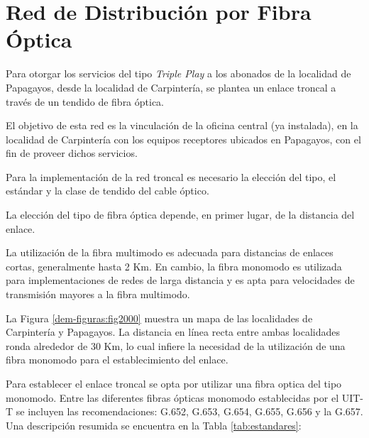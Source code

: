 \section{Red de Distribución por Fibra Óptica}


Para otorgar los servicios del tipo \textit{Triple Play} a los abonados de la localidad de Papagayos, desde la localidad de Carpintería, se plantea un enlace troncal a través de un tendido de fibra óptica.

El objetivo de esta red es la vinculación de la oficina central (ya instalada), en la localidad de Carpintería con los equipos receptores ubicados en Papagayos, con el fin de  proveer dichos servicios.


Para la implementación de la red troncal es necesario la elección del tipo, el estándar y la clase de tendido del cable óptico.


La elección del tipo de fibra óptica depende, en primer lugar, de la distancia del enlace.


La utilización de la fibra multimodo es adecuada para distancias de enlaces cortas, generalmente hasta 2 Km.
En cambio, la fibra monomodo es utilizada para implementaciones de redes de larga distancia y es apta para velocidades de transmisión mayores a la fibra multimodo.


La Figura \ref{dem-figuras:fig2000} muestra un mapa de las localidades de Carpintería y Papagayos. La distancia en línea recta  entre ambas localidades ronda alrededor de 30 Km, lo cual infiere la necesidad de la utilización de una fibra monomodo para el establecimiento del enlace.









Para establecer el enlace troncal se opta por utilizar una fibra optica del tipo monomodo. Entre las diferentes fibras ópticas monomodo establecidas por el UIT-T se incluyen las recomendaciones: G.652, G.653, G.654, G.655, G.656 y la G.657. Una descripción resumida se encuentra en la Tabla \ref{tab:estandares}: 

